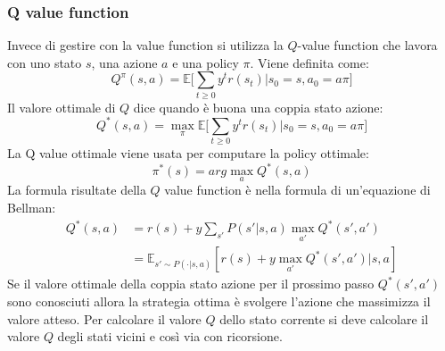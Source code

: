 \subsubsection{Q value function}
Invece di gestire con la value function si utilizza la $Q$-value function che lavora con uno stato $s$, una azione $a$ e una policy $\pi$.
Viene definita come:
$$Q^\pi(s,a) = \mathbb{E}\biggl[\sum\limits_{t\ge 0} y^tr(s_t)|s_0 = s,a_0 = a\pi\biggr]$$
Il valore ottimale di $Q$ dice quando \`e buona una coppia stato azione:
$$Q^*(s,a) =\max_\pi\mathbb{E}\biggl[\sum\limits_{t\ge 0} y^tr(s_t)|s_0 = s,a_0 = a\pi\biggr]$$
La Q value ottimale viene usata per computare la policy ottimale:
$$\pi^*(s) = arg\max_aQ^*(s,a)$$
La formula risultate della $Q$ value function \`e nella formula di un'equazione di Bellman:
\begin{align*}
	Q^*(s,a) &= r(s) + y\sum\limits_{s'}P(s'|s,a)\max_{a'}Q^*(s',a')\\
	&=\mathbb{E}_{s'\sim P(\cdot|s,a)}[r(s)+y\max_{a'}Q^*(s',a')|s,a]
\end{align*}
Se il valore ottimale della coppia stato azione per il prossimo passo $Q^*(s',a')$ sono conosciuti allora la strategia ottima \`e svolgere l'azione che massimizza il valore atteso.
Per calcolare il valore $Q$ dello stato corrente si deve calcolare il valore $Q$ degli stati vicini e cos\`i via con ricorsione.

